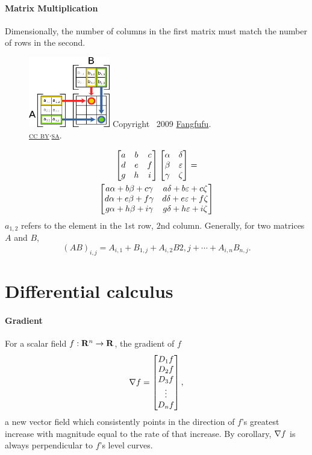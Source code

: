 \documentclass[10pt,landscape]{article}
\begin{document}
\begin{multicols*}{3}
\paragraph{Matrix Multiplication}
Dimensionally, the number of columns in the first matrix must match the number of rows in the second.
\begin{figure}
  \includegraphics[width=1.4in]{matrix-multiplication}
  \scriptsize Copyright \textcopyright\ 2009 \href{http://en.wikipedia.org/wiki/User:Fangfufu}{Fangfufu}.\\\textsc{\href{http://creativecommons.org/licenses/by-sa/3.0/}{cc by$\cdot$sa}}.
\end{figure}
\begin{multline}
  \begin{bmatrix} a & b & c \\ d & e & f \\ g & h & i \end{bmatrix} \begin{bmatrix} \alpha & \delta \\ \beta & \varepsilon \\ \gamma & \zeta \end{bmatrix} = \\ \begin{bmatrix} a\alpha + b\beta + c\gamma & a\delta + b\varepsilon + c\zeta \\ d\alpha + e\beta + f\gamma & d\delta + e\varepsilon + f\zeta \\ g\alpha + h\beta + i\gamma & g\delta + h\varepsilon + i\zeta\end{bmatrix}
\end{multline}
$a_{1,2}$ refers to the element in the $1$st row, $2$nd column.
Generally, for two matrices $A$ and $B$,
\begin{equation}
  (AB)_{i,j} = A_{i,1} + B_{1,j} + A_{i,2}B{2,j} + \cdots + A_{i,n}B_{n,j}.
\end{equation}

\section{Differential calculus}
\paragraph{Gradient}
For a scalar field $f : \mathbf{R}^n \to \mathbf{R}$, the gradient of $f$
\begin{equation}
  \nabla f = \begin{bmatrix} D_1f \\ D_2f \\ D_3f \\ \vdots \\ D_nf \end{bmatrix},
\end{equation}
a new vector field which consistently points in the direction of $f$'s greatest increase with magnitude equal to the rate of that increase.
By corollary, $\nabla f$ is always perpendicular to $f$'s level curves.


\end{multicols*}
\end{document}
